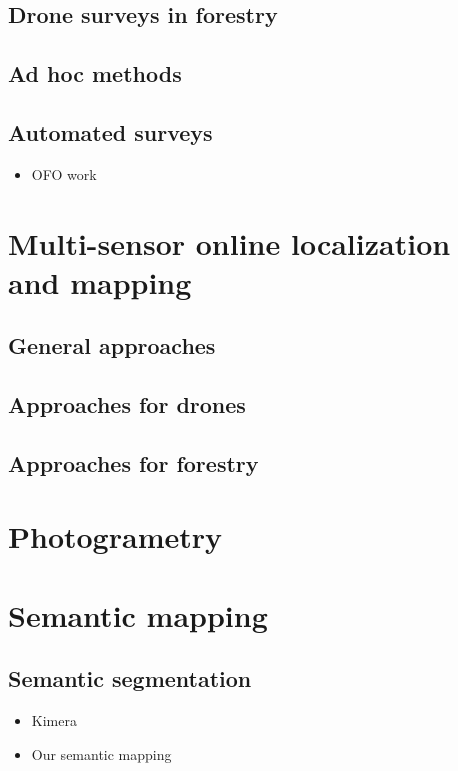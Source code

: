 \subsection{Drone surveys in forestry}
\subsection{Ad hoc methods}
\subsection{Automated surveys}
\begin{itemize}
    \item OFO work \cite{Young2022OptimizingForests} 
\end{itemize}

\section{Multi-sensor online localization and mapping}
\subsection{General approaches}
\subsection{Approaches for drones}
\subsection{Approaches for forestry}

\section{Photogrametry}

\section{Semantic mapping}
\subsection{Semantic segmentation}

\begin{itemize}
    \item Kimera \cite{Rosinol2020}
    \item Our semantic mapping \cite{RussellUnmannedMitigation}
\end{itemize}

